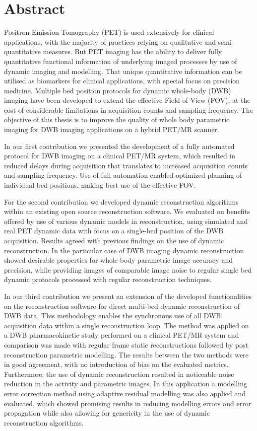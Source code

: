 \section*{Abstract}
Positron Emission Tomography (PET) is used extensively for clinical applications, with the majority of practices relying on qualitative and semi-quantitative measures. But PET imaging has the ability to deliver fully quantitative functional information of underlying imaged processes by use of dynamic imaging and modelling. That unique quantitative information can be utilised as biomarkers for clinical applications, with special focus on precision medicine. Multiple bed position protocols for dynamic whole-body (DWB) imaging have been developed to extend the effective Field of View (FOV), at the cost of considerable limitations in acquisition counts and sampling frequency. The objective of this thesis is to improve the quality of whole body parametric imaging for DWB imaging applications on a hybrid PET/MR scanner.

In our first contribution we presented the development of a fully automated protocol for DWB imaging on a clinical PET/MR system, which resulted in reduced delays during acquisition that translates to increased acquisition counts and sampling frequency. Use of full automation enabled optimized planning of individual bed positions, making best use of the effective FOV. 

For the second contribution we developed dynamic reconstruction algorithms within an existing open source reconstruction software. We evaluated on benefits offered by use of various dynamic models in reconstruction, using simulated and real PET dynamic data with focus on a single-bed position of the DWB acquisition.
Results agreed with previous findings on the use of dynamic reconstruction. In the particular case of DWB imaging dynamic reconstruction showed desirable properties for whole-body parametric image accuracy and precision, while providing images of comparable image noise to regular single bed dynamic protocols processed with regular reconstruction techniques.

In our third contribution we present an extension of the developed functionalities on the reconstruction software for direct multi-bed dynamic reconstruction of DWB data. This methodology enables the synchronous use of all DWB acquisition data within a single reconstruction loop. The method was applied on a DWB pharmacokinetic study performed on a clinical PET/MR system and comparison was made with regular frame static reconstructions followed by post reconstruction parametric modelling. The results between the two methods were in good agreement, with no introduction of bias on the evaluated metrics. Furthermore, the use of dynamic reconstruction resulted in noticeable noise reduction in the activity and parametric images. In this application a modelling error correction method using adaptive residual modelling was also applied and evaluated, which showed promising results in reducing modelling errors and error propagation while also allowing for genericity in the use of dynamic reconstruction algorithms.

